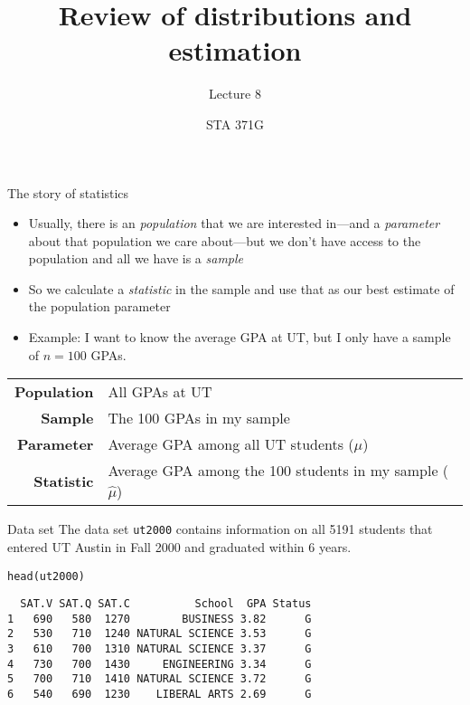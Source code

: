 \documentclass{beamer}\usepackage[]{graphicx}\usepackage[]{color}
\title{Review of distributions and estimation}
\subtitle{Lecture 8}
\author{STA 371G}
\makeatletter
\newcommand{\hlstd}[1]{\textcolor[rgb]{1,0.894,0.769}{#1}}%
\newcommand{\hlkwd}[1]{\textcolor[rgb]{1,0.78,0.769}{#1}}%
\newenvironment{kframe}{%
 \def\at@end@of@kframe{}%
 \ifinner\ifhmode%
  \def\at@end@of@kframe{\end{minipage}}%
  \begin{minipage}{\columnwidth}%
 \fi\fi%
 \def\FrameCommand##1{\hskip\@totalleftmargin \hskip-\fboxsep
 \colorbox{shadecolor}{##1}\hskip-\fboxsep
     \hskip-\linewidth \hskip-\@totalleftmargin \hskip\columnwidth}%
 \MakeFramed {\advance\hsize-\width
   \@totalleftmargin\z@ \linewidth\hsize
   \@setminipage}}%
 {\par\unskip\endMakeFramed%
 \at@end@of@kframe}
\newenvironment{knitrout}{}{} %
\makeatother
\begin{document}
\frame{\maketitle}


\begin{darkframes}

\begin{frame}{The story of statistics}
\begin{itemize}
  \item Usually, there is an \emph{population} that we are interested in---and a \emph{parameter} about that population we care about---but we don't have access to the population and all we have is a \emph{sample} \pause
  \item So we calculate a \emph{statistic} in the sample and use that as our best estimate of the population parameter \pause
  \item Example: I want to know the average GPA at UT, but I only have a sample of $n=100$ GPAs. \pause
\end{itemize}

\begin{tabular}{r|l}
\textbf{Population} & All GPAs at UT \\
\textbf{Sample} & The 100 GPAs in my sample \\
\textbf{Parameter} & Average GPA among all UT students ($\mu$) \\
\textbf{Statistic} & Average GPA among the 100 students in my sample ($\hat\mu$)
\end{tabular}
\end{frame}


\begin{frame}[fragile]{Data set}
The data set \texttt{ut2000} contains information on all 5191 students that entered UT Austin in Fall 2000 and graduated within 6 years.
\begin{knitrout}
\begin{kframe}
\begin{alltt}
\hlkwd{head}\hlstd{(ut2000)}
\end{alltt}
\begin{verbatim}
  SAT.V SAT.Q SAT.C          School  GPA Status
1   690   580  1270        BUSINESS 3.82      G
2   530   710  1240 NATURAL SCIENCE 3.53      G
3   610   700  1310 NATURAL SCIENCE 3.37      G
4   730   700  1430     ENGINEERING 3.34      G
5   700   710  1410 NATURAL SCIENCE 3.72      G
6   540   690  1230    LIBERAL ARTS 2.69      G
\end{verbatim}
\end{kframe}
\end{knitrout}
\end{frame}



\end{darkframes}
\end{document}
